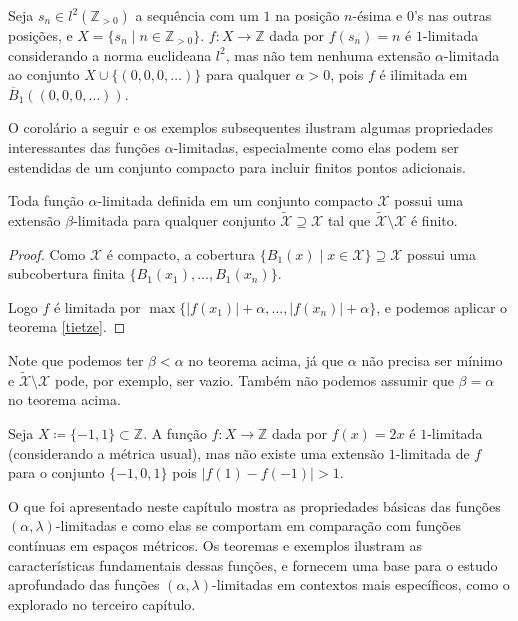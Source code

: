 

\begin{example}
  Seja $s_n \in l^2(\mathbb{Z}_{> 0})$ a sequência com um $1$ na posição $n$-ésima e $0$'s nas outras posições, e $X = \{ s_n \mid n \in \mathbb{Z}_{> 0} \}$. $f : X \to \mathbb{Z}$ dada por $f(s_n) = n$ é $1$-limitada considerando a norma euclideana $l^2$, mas não tem nenhuma extensão $\alpha$-limitada ao conjunto $X \cup \{(0, 0, 0, \dots)\}$ para qualquer $\alpha > 0$, pois $f$ é ilimitada em $\overline{B}_1((0, 0, 0, \dots))$.
\end{example}



O corolário a seguir e os exemplos subsequentes ilustram algumas propriedades interessantes das funções $\alpha$-limitadas, especialmente como elas podem ser estendidas de um conjunto compacto para incluir finitos pontos adicionais.

\begin{corollary}
  Toda função $\alpha$-limitada definida em um conjunto compacto $\mathcal{X}$ possui uma extensão $\beta$-limitada para qualquer conjunto $\tilde{\mathcal{X}} \supseteq \mathcal{X}$ tal que $\tilde{\mathcal{X}} \setminus \mathcal{X}$ é finito.
\end{corollary}
\begin{proof}
  Como $\mathcal{X}$ é compacto, a cobertura $\{ B_1(x) \mid x \in \mathcal{X} \} \supseteq \mathcal{X}$ possui uma subcobertura finita $\{ B_1(x_1), \dots, B_1(x_n)\}$.

  Logo $f$ é limitada por $\max\{\lvert f(x_1) \rvert + \alpha, \dots, \lvert f(x_n) \rvert + \alpha\}$, e podemos aplicar o teorema \ref{tietze}.
\end{proof}

Note que podemos ter $\beta < \alpha$ no teorema acima, já que $\alpha$ não precisa ser mínimo e $\tilde{\mathcal{X}} \setminus \mathcal{X}$ pode, por exemplo, ser vazio. Também não podemos assumir que $\beta = \alpha$ no teorema acima.

\begin{example}
  Seja $X \coloneqq \{-1, 1\} \subset \mathbb{Z}$. A função $f : X \to \mathbb{Z}$ dada por $f(x) = 2x$ é $1$-limitada (considerando a métrica usual), mas não existe uma extensão $1$-limitada de $f$ para o conjunto $\{-1, 0, 1\}$ pois $\lvert f(1) - f(-1) \rvert > 1$.
\end{example}

O que foi apresentado neste capítulo mostra as propriedades básicas das funções $(\alpha,\lambda)$-limitadas e como elas se comportam em comparação com funções contínuas em espaços métricos. Os teoremas e exemplos ilustram as características fundamentais dessas funções, e fornecem uma base para o estudo aprofundado das funções $(\alpha,\lambda)$-limitadas em contextos mais específicos, como o explorado no terceiro capítulo.
